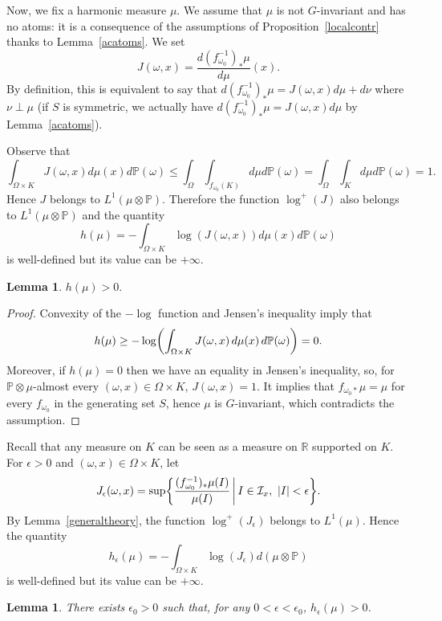 \documentclass[10pt]{amsart}
\newtheorem{lemm}[theo]{Lemma}\newtheorem{prop}[theo]{Proposition}\newtheorem{coro}[theo]{Corollary}\newtheorem{conj}[theo]{Conjecture}
\theoremstyle{definition}\newtheorem{defi}[theo]{Definition}\newtheorem{rema}[theo]{Remark}\newtheorem{exam}[theo]{Example}\newtheorem{exem}[theo]{Example}\newtheorem{nota}[theo]{Notation}
\newcommand{\bbP}{\mathbb{P}}
\newcommand{\R}{\mathbb{R}}
\newcommand{\clI}{\mathcal{I}}
\let\originalleft\left
\let\originalright\right
\renewcommand{\left}{\mathopen{}\mathclose\bgroup\originalleft}
\renewcommand{\right}{\aftergroup\egroup\originalright}
\begin{document}
Now, we fix a harmonic measure $\mu$. We assume that $\mu$ is not $G$-invariant and has no atoms: it is a consequence of the assumptions of Proposition~\ref{localcontr} thanks to Lemma~\ref{acatoms}. We set
\[
J(\omega,x)= \frac{d (f_{\omega_{0}}^{-1})_{*} \mu}{d\mu}(x).
\]
By definition, this is equivalent to say that $d(f_{\omega_{0}}^{-1})_{*}\mu=J(\omega,x) d\mu+d\nu$ where $\nu\perp\mu$ (if $S$ is symmetric, we actually have $d(f_{\omega_{0}}^{-1})_{*}\mu=J(\omega,x) d\mu$ by Lemma~\ref{acatoms}).


Observe that
\[
\int_{\Omega \times K} J(\omega,x) d\mu(x) d \bbP(\omega)\leq \int_{\Omega} \int_{f_{\omega_{0}}(K)} d \mu d\bbP(\omega) =\int_{\Omega} \int_{K} d \mu d\bbP(\omega)=1.
\]
Hence $J$ belongs to $L^{1}(\mu \otimes \bbP)$. Therefore the function $\log^{+}(J)$ also belongs to $L^{1}(\mu \otimes \bbP)$ and the quantity
\[
h(\mu)= - \int_{\Omega \times K} \log(J(\omega,x)) d\mu(x) d\bbP(\omega)
\]
is well-defined but its value can be $+\infty$.

\begin{lemm}\label{positiveentropy}
$h(\mu)>0.$
\end{lemm}

\begin{proof}
Convexity of the $-\log$ function and Jensen's inequality imply that
\[
h(\mu) \geq - \log\left(\int_{\Omega \times K} J(\omega,x)\, d\mu(x)\,
d \bbP(\omega)\right)=0.
\]
Moreover, if $h(\mu)=0$ then we have an equality in Jensen's inequality, so, for $\bbP \otimes \mu$-almost every $(\omega,x) \in \Omega \times K$, $J(\omega,x)=1$. It implies that $f_{\omega_0 *}\mu=\mu$ for every $f_{\omega_0}$ in the generating set $S$, hence $\mu$ is $G$-invariant, which contradicts the assumption.
\end{proof}

Recall that any measure on $K$ can be seen as a measure on $\R$ supported on $K$. For $\epsilon >0$ and $(\omega,x) \in \Omega \times K$, let
\[
J_{\epsilon}(\omega,x)= \sup \left\{ \frac{(f_{\omega_0}^{-1})_{*}\mu(I)}{\mu(I)} \, \middle| \, I \in \clI_{x}, \ |I| < \epsilon \right\}.
\]
By Lemma~\ref{generaltheory}, the function $\log^{+}(J_{\epsilon})$ belongs to $L^{1}(\mu)$. Hence the quantity
\[
h_{\epsilon}(\mu)= - \int_{\Omega \times K} \log(J_{\epsilon}) d(\mu \otimes \bbP)
\]
is well-defined but its value can be $+\infty$.

\begin{lemm}\label{approxentr}
There exists $\epsilon_{0} >0$ such that, for any $0 <\epsilon< \epsilon_{0}$, $h_{\epsilon}(\mu) >0$.
\end{lemm}
\end{document}
